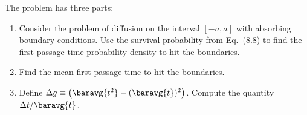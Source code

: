 

The problem has three parts:
\begin{enumerate}[\indent a.]
  \item Consider the problem of diffusion on the interval $[-a, a]$ with absorbing boundary conditions. Use the survival probability from Eq.~(8.8) to find the first passage time probability density to hit the boundaries.
  \item Find the mean first-passage time to hit the boundaries.
  \item Define $\Delta g \equiv \left( \baravg{t^2} - (\baravg{t})^2 \right)$. Compute the quantity $\Delta t / \baravg{t}$.
\end{enumerate}



